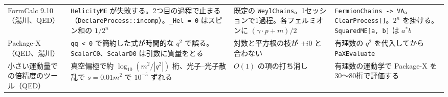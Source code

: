 \documentclass[a4paper,10pt]{ltjsarticle}
\begin{document}
\begin{table}[p]
\begin{tabularx}{\linewidth}{>{\raggedright\arraybackslash}p{2.4cm}>{\raggedright\arraybackslash}X>{\raggedright\arraybackslash}X>{\raggedright\arraybackslash}X}
FormCalc 9.10（湯川、QED） & \texttt{HelicityME} が失敗する。2つ目の過程で止まる（\texttt{DeclareProcess::incomp}）。\texttt{\_Hel = 0} はスピン和の $1/2^n$ & 既定の \texttt{WeylChains}。1セッションで1過程。各フェルミオンに $(\gamma\cdot p+m)/2$ & \texttt{FermionChains -> VA}。\texttt{ClearProcess[]}。$2^n$ を掛ける。\texttt{SquaredME[a, b]} は $a^*b$ \\
Package-X（QED、湯川） & \texttt{qq < 0} で簡約した式が時間的な $q^2$ で誤る。\texttt{ScalarC0}、\texttt{ScalarD0} は引数に質量をとる & 対数と平方根の枝が $+i0$ と合わない & 有理数の $q^2$ を代入してから \texttt{PaXEvaluate} \\
小さい運動量での倍精度のツール（QED） & 真空偏極で約 $\log_{10}(m^2/|q^2|)$ 桁、光子--光子散乱で $s=0.01m^2$ で $10^{-5}$ ずれる & $O(1)$ の項の打ち消し & 有理数の運動学で Package-X を30〜80桁で評価する \\
\bottomrule
\end{tabularx}
\end{table}
\end{document}
